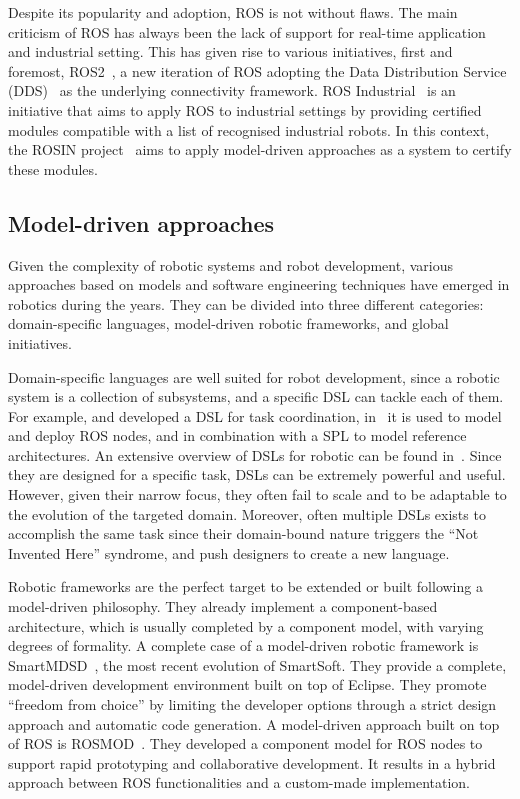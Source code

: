 Despite its popularity and adoption, ROS is not without flaws. The main criticism of ROS has always been the lack of support for real-time application and industrial setting. This has given rise to various initiatives, first and foremost, ROS2~\cite{ros2}, a new iteration of ROS adopting the Data Distribution Service (DDS)~\cite{pardo2003omg} as the underlying connectivity framework. ROS Industrial~\cite{edwards2012ros} is an initiative that aims to apply ROS to industrial settings by providing certified modules compatible with a list of recognised industrial robots. In this context, the ROSIN project~\cite{rosin} aims to apply model-driven approaches as a system to certify these modules.

\subsection{Model-driven approaches}
Given the complexity of robotic systems and robot development, various approaches based on models and software engineering techniques have emerged in robotics during the years. They can be divided into three different categories: domain-specific languages, model-driven robotic frameworks, and global initiatives.

Domain-specific languages are well suited for robot development, since a robotic system is a collection of subsystems, and a specific DSL can tackle each of them. For example, \cite{steck2011managing} and \cite{klotzbucher2012coordinating} developed a DSL for task coordination, in~\cite{hochgeschwender2013model} it is used to model and deploy ROS nodes, and \cite{gherardi2011eclipse} in combination with a SPL to model reference architectures. An extensive overview of DSLs for robotic can be found in~\cite{nordmann2014survey}. Since they are designed for a specific task, DSLs can be extremely powerful and useful. However, given their narrow focus, they often fail to scale and to be adaptable to the evolution of the targeted domain. Moreover, often multiple DSLs exists to accomplish the same task since their domain-bound nature triggers the ``Not Invented Here'' syndrome, and push designers to create a new language.

Robotic frameworks are the perfect target to be extended or built following a model-driven philosophy. They already implement a component-based architecture, which is usually completed by a component model, with varying degrees of formality. A complete case of a model-driven robotic framework is SmartMDSD~\cite{dennis2016smartmdsd}, the most recent evolution of SmartSoft. They provide a complete, model-driven development environment built on top of Eclipse. They promote ``freedom from choice'' by limiting the developer options through a strict design approach and automatic code generation. A model-driven approach built on top of ROS is ROSMOD~\cite{kumar2016rosmod}. They developed a component model for ROS nodes to support rapid prototyping and collaborative development. It results in a hybrid approach between ROS functionalities and a custom-made implementation.

